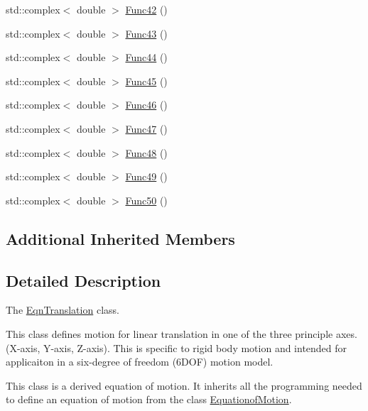 \begin{DoxyCompactItemize}
\item 
std\-::complex$<$ double $>$ \hyperlink{classosea_1_1ofreq_1_1_eqn_translation_a2ab1137a5120dda368403b315f86da9a}{Func42} ()
\item 
std\-::complex$<$ double $>$ \hyperlink{classosea_1_1ofreq_1_1_eqn_translation_a916d10d7c56ae92d98de3986f2a131ef}{Func43} ()
\item 
std\-::complex$<$ double $>$ \hyperlink{classosea_1_1ofreq_1_1_eqn_translation_a0ce24a5b1db03adcffd51e97ace09326}{Func44} ()
\item 
std\-::complex$<$ double $>$ \hyperlink{classosea_1_1ofreq_1_1_eqn_translation_aaa3e94d3c1f99a3642a5747446b26ddc}{Func45} ()
\item 
std\-::complex$<$ double $>$ \hyperlink{classosea_1_1ofreq_1_1_eqn_translation_a84705a29bca50a273c8e18d8775e5a48}{Func46} ()
\item 
std\-::complex$<$ double $>$ \hyperlink{classosea_1_1ofreq_1_1_eqn_translation_ab213b139add2e6fb33a4b7ab27d0bce0}{Func47} ()
\item 
std\-::complex$<$ double $>$ \hyperlink{classosea_1_1ofreq_1_1_eqn_translation_a7783f7d20c62ef93424a84595bddda74}{Func48} ()
\item 
std\-::complex$<$ double $>$ \hyperlink{classosea_1_1ofreq_1_1_eqn_translation_a0ed9b4791abf0024f09508c588612490}{Func49} ()
\item 
std\-::complex$<$ double $>$ \hyperlink{classosea_1_1ofreq_1_1_eqn_translation_a138a4372b52ad6e1ef924084a4d760bd}{Func50} ()
\end{DoxyCompactItemize}
\subsection*{Additional Inherited Members}


\subsection{Detailed Description}
The \hyperlink{classosea_1_1ofreq_1_1_eqn_translation}{Eqn\-Translation} class. 

This class defines motion for linear translation in one of the three principle axes. (X-\/axis, Y-\/axis, Z-\/axis). This is specific to rigid body motion and intended for applicaiton in a six-\/degree of freedom (6\-D\-O\-F) motion model. 

 This class is a derived equation of motion. It inherits all the programming needed to define an equation of motion from the class \hyperlink{classosea_1_1ofreq_1_1_equationof_motion}{Equationof\-Motion}.

